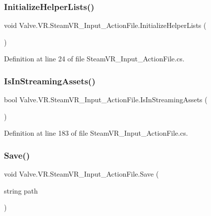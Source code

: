 \subsubsection{\texorpdfstring{InitializeHelperLists()}{InitializeHelperLists()}}
{\footnotesize\ttfamily void Valve.\+V\+R.\+Steam\+V\+R\+\_\+\+Input\+\_\+\+Action\+File.\+Initialize\+Helper\+Lists (\begin{DoxyParamCaption}{ }\end{DoxyParamCaption})}



Definition at line 24 of file Steam\+V\+R\+\_\+\+Input\+\_\+\+Action\+File.\+cs.

\mbox{\label{class_valve_1_1_v_r_1_1_steam_v_r___input___action_file_a5d54def4009d0a415d5530fc85bd4565}} 
\subsubsection{\texorpdfstring{IsInStreamingAssets()}{IsInStreamingAssets()}}
{\footnotesize\ttfamily bool Valve.\+V\+R.\+Steam\+V\+R\+\_\+\+Input\+\_\+\+Action\+File.\+Is\+In\+Streaming\+Assets (\begin{DoxyParamCaption}{ }\end{DoxyParamCaption})}



Definition at line 183 of file Steam\+V\+R\+\_\+\+Input\+\_\+\+Action\+File.\+cs.

\mbox{\label{class_valve_1_1_v_r_1_1_steam_v_r___input___action_file_a6ef31fa0d9acce2fc48e0f76d68402a5}} 
\subsubsection{\texorpdfstring{Save()}{Save()}}
{\footnotesize\ttfamily void Valve.\+V\+R.\+Steam\+V\+R\+\_\+\+Input\+\_\+\+Action\+File.\+Save (\begin{DoxyParamCaption}\item[{string}]{path }\end{DoxyParamCaption})}



